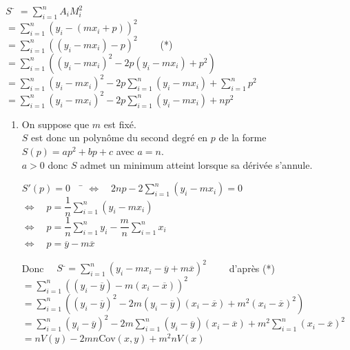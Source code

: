 \documentclass[a4paper,11pt,cours]{nsi} %
\begin{document}
\begin{demonstration}
    \begin{tabbing}
        $S$ \= $=\displaystyle \sum_{i=1}^n A_iM_i^2$ \\
        \> $=\displaystyle \sum_{i=1}^n \left(y_i-(mx_i+p)\right)^2$\\
        \> $=\displaystyle \sum_{i=1}^n \left((y_i-mx_i)-p\right)^2 \qquad$ (*)\\
        \> $=\displaystyle \sum_{i=1}^n \left((y_i-mx_i)^2-2p(y_i-mx_i)+p^2\right)$\\
        \> $=\displaystyle \sum_{i=1}^n (y_i-mx_i)^2-2p\sum_{i=1}^n (y_i-mx_i)+ \sum_{i=1}^np^2$\\
        \> $=\displaystyle \sum_{i=1}^n (y_i-mx_i)^2-2p\sum_{i=1}^n (y_i-mx_i)+np^2$
    \end{tabbing}
    \begin{enumerate}[label=\textbullet]
        \item On suppose que $m$ est fixé.\\
        $S$ est donc un polynôme du second degré en $p$ de la forme $S(p)=ap^2+bp+c$ avec $a=n$.\\
        $a>0$ donc $S$ admet un minimum atteint lorsque sa dérivée s'annule.
        \begin{tabbing}
            $S'(p)=0\quad$ \= $\iff \quad \displaystyle 2np-2\sum_{i=1}^n (y_i-mx_i)=0$\\
            \> $\iff \quad \displaystyle p=\dfrac{1}{n}\sum_{i=1}^n (y_i-mx_i)$\\
            \> $\iff \quad \displaystyle p=\dfrac{1}{n}\sum_{i=1}^n y_i-\dfrac{m}{n}\sum_{i=1}^n x_i$\\
            \> $\iff \quad \displaystyle p=\overline{y}-m\overline{x}$
        \end{tabbing}

        \begin{tabbing}
            Donc $\quad S$  \=$=\displaystyle \sum_{i=1}^n \left(y_i-mx_i-\overline{y}+m\overline{x}\right)^2 \qquad$ d'après (*)\\
            \> $=\displaystyle \sum_{i=1}^n \left((y_i-\overline{y})-m\left(x_i-\overline{x}\right)\right)^2$\\
            \> $=\displaystyle \sum_{i=1}^n \left((y_i-\overline{y})^2-2m(y_i-\overline{y})(x_i-\overline{x})+m^2(x_i-\overline{x})^2\right)$\\
            \> $=\displaystyle \sum_{i=1}^n (y_i-\overline{y})^2-2m\sum_{i=1}^n (y_i-\overline{y})(x_i-\overline{x})+m^2\sum_{i=1}^n (x_i-\overline{x})^2$\\
            \> $=\displaystyle nV(y)-2mn \mathrm{Cov}(x,y)+m^2nV(x)$
        \end{tabbing}


\end{enumerate}
\end{demonstration}
\end{document}
